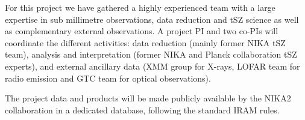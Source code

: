 \documentclass[11pt,a4paper,twoside,graphicx,color]{article}
\begin{document}

\vspace{0.3cm}  
For this project we have gathered a highly experienced team with a large expertise in sub millimetre observations, data reduction and tSZ science as well as complementary external observations.
A project PI and two co-PIs will coordinate the different activities: data reduction (mainly former NIKA tSZ team), analysis and interpretation (former NIKA and Planck collaboration tSZ experts), and
external ancillary data (XMM group for X-rays, LOFAR team for radio emission and GTC team for optical observations).

\vspace{0.3cm}  
The project data and products will be made publicly available by the NIKA2 collaboration in a dedicated database, following the standard IRAM rules.
\end{document}
